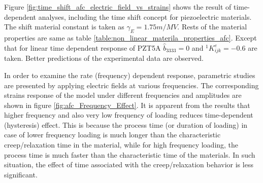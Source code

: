 Figure \ref{fig:time_shift_afc_electric_field_vs_strains} shows the result of time-dependent analyses, including the time shift concept for piezoelectric materials.
The shift material constant is taken as $\gamma_{E}=1.75 m/MV$. 
Rests of the material properties are same as table  \ref{table:non_linear_materila_properties_afc}.
Except that for linear time dependent response of PZT5A $\widehat{b}_{3333}=0$ and ${}^{1}K_{ijk}^{e}=-0.6$ are taken.
Better predictions of the experimental data are observed.



In order to examine the rate (frequency) dependent response, parametric studies are presented by applying electric fields at various frequencies. The corresponding strains response of the model under different frequencies and amplitudes are shown in figure \ref{fig:afc_Frequency_Effect}. It is apparent from the results that higher frequency and also very low frequency of loading reduces time-dependent (hysteresis) effect. This is because the process time (or duration of loading) in case of lower frequency loading is much longer than the characteristic creep/relaxation time in the material, while for high frequency loading, the process time is much faster than the characteristic time of the materials. In such situation, the effect of time associated with the creep/relaxation behavior is less significant. 

